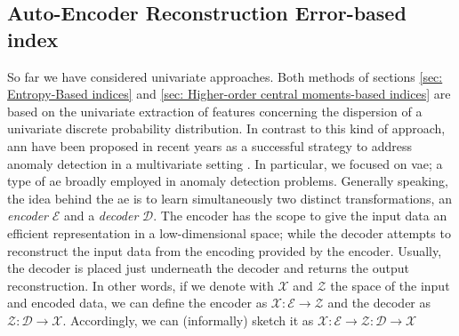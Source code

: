 \subsection{Auto-Encoder Reconstruction Error-based index}\label{sec: Auto-Encoder Reconstruction Error-based index}
So far we have considered univariate approaches.
Both methods of sections \ref{sec: Entropy-Based indices} and \ref{sec: Higher-order central moments-based indices} are based on the univariate extraction of features concerning the dispersion of a univariate discrete probability distribution.
In contrast to this kind of approach, \gls{ann} have been proposed in recent years as a successful strategy to address anomaly detection in a multivariate setting \cite[]{an2015variational, zhou2017anomaly}.
In particular, we focused on \gls{vae}; a type of \gls{ae} broadly employed in anomaly detection problems.
Generally speaking, the idea behind the \gls{ae} is to learn simultaneously two distinct transformations, an \emph{encoder} $\mathcal{E}$ and a \emph{decoder} $\mathcal{D}$.
The encoder has the scope to give the input data an efficient representation in a low-dimensional space; 
while the decoder attempts to reconstruct the input data from the encoding provided by the encoder.
Usually, the decoder is placed just underneath the decoder and returns the output reconstruction.
In other words, if we denote with $\mathcal{X}$ and $\mathcal{Z}$ the space of the input and encoded data, we can define the encoder as $\mathcal{X}:\mathcal{E} \to \mathcal{Z}$ and the decoder as $\mathcal{Z}:\mathcal{D} \to \mathcal{X}$.
Accordingly, we can (informally) sketch it as $\mathcal{X}:\mathcal{E} \to \mathcal{Z} : \mathcal{D} \to \mathcal{X}$

